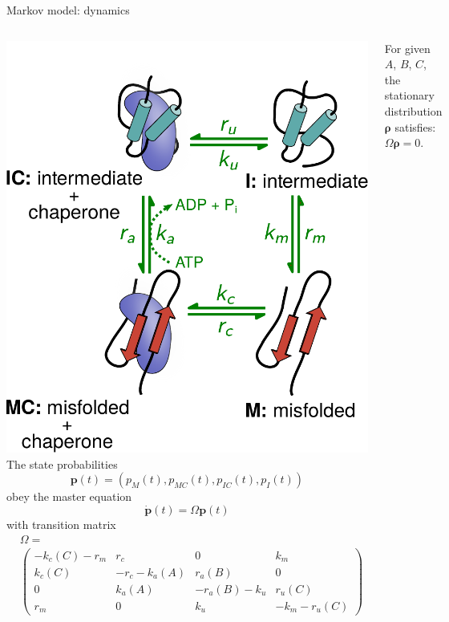 \documentclass{beamer}
\begin{document}
\begin{frame}{Markov model: dynamics}

  \vspace{0.5em}
  \begin{columns}[T]
    \centering
    \includegraphics[width=\textwidth]{markov4.pdf}
    The state probabilities
    \[
    \bm{p}(t) = (p_M(t),p_{MC}(t),p_{IC}(t),p_I(t))
    \]
    obey the master equation
    \[
    \dot{\bm{p}}(t) = \Omega \bm{p}(t)
    \]
    with transition matrix
    \[
    \begin{split}
&\Omega =\\
&\left(\begin{smallmatrix} 
-k_c(C) -r_m & r_c & 0 & k_m \\ 
k_c(C) & -r_c -k_a(A) & r_a(B) & 0\\
0 & k_a(A) & -r_a(B) - k_u & r_u(C)\\
r_m & 0 & k_u & -k_m - r_u(C)
      \end{smallmatrix}\right)
      \end{split}
    \]
    \pause

For given $A$, $B$, $C$, the {\color{blue} stationary distribution} $\bm{\rho}$ satisfies: $\Omega \bm{\rho} = 0$.

    \end{columns}
\end{frame}
\end{document}
